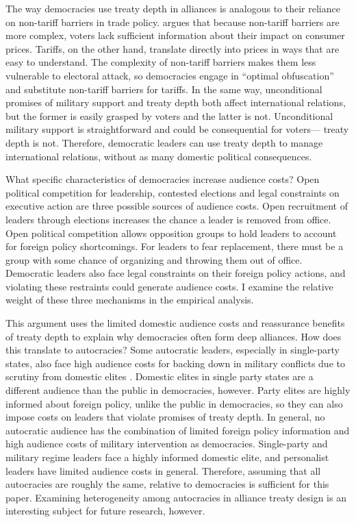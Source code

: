 \documentclass[12pt]{article}
\begin{document}
The way democracies use treaty depth in alliances is analogous to their reliance on non-tariff barriers in trade policy.
\citet{Kono2006} argues that because non-tariff barriers are more complex, voters lack sufficient information about their impact on consumer prices.
Tariffs, on the other hand, translate directly into prices in ways that are easy to understand.
The complexity of non-tariff barriers makes them less vulnerable to electoral attack, so democracies engage in ``optimal obfuscation'' and substitute non-tariff barriers for tariffs. 
In the same way, unconditional promises of military support and treaty depth both affect international relations, but the former is easily grasped by voters and the latter is not. 
Unconditional military support is straightforward and could be consequential for voters--- treaty depth is not. 
Therefore, democratic leaders can use treaty depth to manage international relations, without as many domestic political consequences.


What specific characteristics of democracies increase audience costs? 
Open political competition for leadership, contested elections and legal constraints on executive action are three possible sources of audience costs. 
Open recruitment of leaders through elections increases the chance a leader is removed from office. 
Open political competition allows opposition groups to hold leaders to account for foreign policy shortcomings. 
For leaders to fear replacement, there must be a group with some chance of organizing and throwing them out of office.
Democratic leaders also face legal constraints on their foreign policy actions, and violating these restraints could generate audience costs. 
I examine the relative weight of these three mechanisms in the empirical analysis.  


This argument uses the limited domestic audience costs and reassurance benefits of treaty depth to explain why democracies often form deep alliances. 
How does this translate to autocracies? 
Some autocratic leaders, especially in single-party states, also face high audience costs for backing down in military conflicts due to scrutiny from domestic elites \citep{Weeks2014}.
Domestic elites in single party states are a different audience than the public in democracies, however.  
Party elites are highly informed about foreign policy, unlike the public in democracies, so they can also impose costs on leaders that violate promises of treaty depth. 
In general, no autocratic audience has the combination of limited foreign policy information and high audience costs of military intervention as democracies.
Single-party and military regime leaders face a highly informed domestic elite, and personalist leaders have limited audience costs in general. 
Therefore, assuming that all autocracies are roughly the same, relative to democracies is sufficient for this paper. 
Examining heterogeneity among autocracies in alliance treaty design is an interesting subject for future research, however. 
\end{document}
